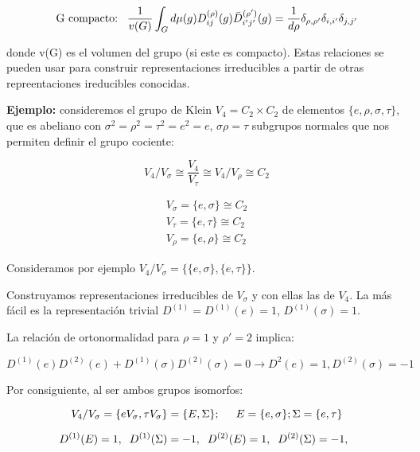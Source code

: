\documentclass{article}
\begin{document}
$$\text{G compacto:} \hspace{0.3cm} \frac{1}{v(G)}\int _G d\mu (g) D_{ij}^{(\rho )} (g) \bar{D}_{i'j'}^{ (\rho ')}(g)=\frac{1}{d\rho}\delta _{\rho , \rho '}\delta _{i, i'}\delta _{j,j'}$$

donde v(G) es el volumen del grupo (si este es compacto). Estas relaciones se pueden usar para construir representaciones irreducibles a partir de otras repreentaciones ireducibles conocidas.

\smallskip

\textbf{Ejemplo:} consideremos el grupo de Klein $V_4=C_2 \times C_2$ de elementos $\lbrace e, \rho , \sigma , \tau \rbrace $, que es abeliano con $\sigma ^2 = \rho ^2 = \tau ^2 =e^2 =e$, $\sigma \rho = \tau$ subgrupos normales que nos permiten definir el grupo cociente:

$$V_4/V_\sigma \cong \frac{V_4}{V_\tau}\cong V_4/V_\rho \cong C_2 $$

$$\begin{array}{c}
V_\sigma =\lbrace e, \sigma \rbrace \cong C_2  \\
V_\tau = \lbrace e, \tau \rbrace \cong C_2 \\
V_\rho = \lbrace e, \rho \rbrace  \cong C_2
\end{array}$$

\smallskip
Consideramos por ejemplo $V_4/V_\sigma =\lbrace \lbrace e, \sigma \rbrace , \lbrace e, \tau \rbrace \rbrace$.
\bigskip

Construyamos representaciones irreducibles de $V_\sigma $ y con ellas las de $V_4$. La más fácil es la representación trivial $D^{(1)}=D^{(1)}(e)=1$, $D^{(1)}(\sigma)=1$.

\smallskip
La relación de ortonormalidad para $\rho =1$ y $\rho '=2$ implica:

$$D^{(1)}(e)D^{(2)}(e)+D^{(1)}(\sigma)D^{(2)}(\sigma)=0 \to D^{2}(e)=1, D^{(2)}(\sigma)=-1$$

Por consiguiente, al ser ambos grupos isomorfos:

$$V_4/V_\sigma =\lbrace eV_\sigma, \tau V_\sigma \rbrace =\lbrace E, \Sigma \rbrace; \hspace{0.5cm} E=\lbrace e, \sigma \rbrace; \Sigma = \lbrace e, \tau \rbrace$$

$$D^{(1)}(E)=1, \hspace{0.2cm} D^{(1)}(\Sigma)=-1, \hspace{0.2cm} D^{(2)}(E)=1, \hspace{0.2cm} D^{(2)}(\Sigma)=-1, \hspace{0.2cm}$$
\end{document}
